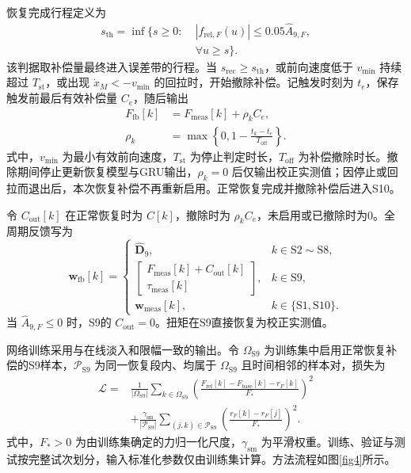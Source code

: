 \documentclass{JQRnew}
\providecommand{\RevisionColor}{\color{black}}
\newcommand{\revbegin}{\begingroup\RevisionColor}
\newcommand{\revend}{\par\endgroup}
\begin{document}
\revbegin
恢复完成行程定义为
\begin{equation}
\label{eq:completion-travel}
\begin{aligned}
s_{\mathrm{th}}=\inf\big\{s\ge0:\;&|f_{\mathrm{rel},F}(u)|
\le0.05\widehat A_{9,F},\\
&\forall u\ge s\big\}.
\end{aligned}
\end{equation}
该判据取补偿量最终进入误差带的行程。当 $s_{\mathrm{rec}}\ge s_{\mathrm{th}}$，或前向速度低于 $v_{\min}$ 持续超过 $T_{\mathrm{st}}$，或出现 $\dot x_M<-v_{\min}$ 的回拉时，开始撤除补偿。记触发时刻为 $t_e$，保存触发前最后有效补偿量 $C_e$，随后输出
\begin{equation}
\label{eq:withdrawal}
\begin{aligned}
F_{\mathrm{fb}}[k]&=F_{\mathrm{meas}}[k]+\rho_kC_e,\\
\rho_k&=\max\!\left\{0,1-\frac{t_k-t_e}{T_{\mathrm{off}}}\right\}.
\end{aligned}
\end{equation}
式中，$v_{\min}$ 为最小有效前向速度，$T_{\mathrm{st}}$ 为停止判定时长，$T_{\mathrm{off}}$ 为补偿撤除时长。撤除期间停止更新恢复模型与GRU输出，$\rho_k=0$ 后仅输出校正实测值；因停止或回拉而退出后，本次恢复补偿不再重新启用。正常恢复完成并撤除补偿后进入S10。
\revend

\revbegin
令 $C_{\mathrm{out}}[k]$ 在正常恢复时为 $C[k]$，撤除时为 $\rho_kC_e$，未启用或已撤除时为0。全周期反馈写为
\begin{equation}
\label{eq:phase-output}
\bm w_{\mathrm{fb}}[k]=
\begin{cases}
\widehat{\bm D}_9,&k\in\mathrm{S2}\sim\mathrm{S8},\\
\begin{bmatrix}F_{\mathrm{meas}}[k]+C_{\mathrm{out}}[k]\\
\tau_{\mathrm{meas}}[k]\end{bmatrix},&k\in\mathrm{S9},\\
\bm w_{\mathrm{meas}}[k],&k\in\{\mathrm{S1},\mathrm{S10}\}.
\end{cases}
\end{equation}
当 $\widehat A_{9,F}\le0$ 时，S9的 $C_{\mathrm{out}}=0$。扭矩在S9直接恢复为校正实测值。
\revend

\revbegin
网络训练采用与在线淡入和限幅一致的输出。令 $\Omega_{\mathrm{S9}}$ 为训练集中启用正常恢复补偿的S9样本，$\mathcal P_{\mathrm{S9}}$ 为同一恢复段内、均属于 $\Omega_{\mathrm{S9}}$ 且时间相邻的样本对，损失为
\begin{equation}
\label{eq:gru-loss}
\begin{aligned}
\mathcal L={}&\frac{1}{|\Omega_{\mathrm{S9}}|}\sum_{k\in\Omega_{\mathrm{S9}}}
\left(\frac{F_{\mathrm{ref}}[k]-F_{\mathrm{base}}[k]-r_F[k]}{F_*}\right)^2\\
&+\frac{\gamma_{\mathrm{sm}}}{|\mathcal P_{\mathrm{S9}}|}
\sum_{(j,k)\in\mathcal P_{\mathrm{S9}}}
\left(\frac{r_F[k]-r_F[j]}{F_*}\right)^2.
\end{aligned}
\end{equation}
式中，$F_*>0$ 为由训练集确定的力归一化尺度，$\gamma_{\mathrm{sm}}$ 为平滑权重。训练、验证与测试按完整试次划分，输入标准化参数仅由训练集计算。方法流程如图\ref{fig4}所示。
\revend
\end{document}
